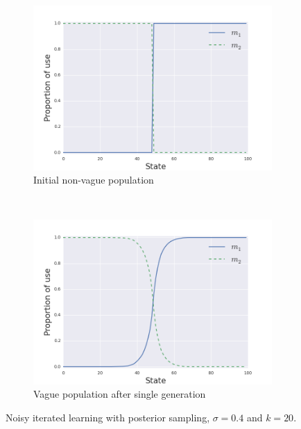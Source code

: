 \documentclass[10pt,a4paper]{article}
\begin{document}
\begin{figure}[ht]
  \centering
  \begin{subfigure}[b]{0.45\textwidth}
    \includegraphics[scale=0.4]{../code/plots/vag-gen0.png}
    \caption{Initial non-vague population}
    \label{fig:vaga}
  \end{subfigure}
  ~
   \begin{subfigure}[b]{0.45\textwidth}
    \includegraphics[scale=0.4]{../code/plots/vag-gen1.png}
    \caption{Vague population after single generation}
    \label{fig:vagb}

  \end{subfigure}
  \caption{Noisy iterated learning with posterior sampling, $\sigma = 0.4$ and $k = 20$.}
  \label{fig:vag}
\end{figure}
 
\end{document}

